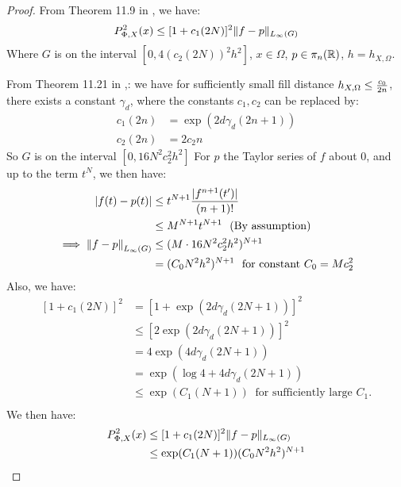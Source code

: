 \documentclass[twoside]{memoir}
\begin{document}
\begin{proof}
	From Theorem 11.9 in \cite{ScatteredDataApproximation}, we have:
	\[ P_{\Phi, X}^2(x) \leq [1 + c_1(2N)]^2 \lVert f - p\rVert_{L_\infty(G)} \]
	Where $G$ is on the interval $[0, 4(c_2(2N))^2h^2]$, $x \in \Omega$, $p \in \pi_n(\mathbb{R})$, $h = h_{X, \Omega}$.
	
	From Theorem 11.21 in \cite{ScatteredDataApproximation},: we have for sufficiently small fill distance $h_{X,\Omega} \leq \frac{c_0}{2n}$, there exists a constant $\gamma_d$, where the constants $c_1, c_2$ can be replaced by:
	\begin{equation*}
	\begin{split}
	c_1(2n) &= \exp(2d\gamma_d(2n+1))\\
	c_2(2n) &= 2c_2n
	\end{split}
	\end{equation*}
	So $G$ is on the interval $[0, 16N^2c_2^2h^2]$
	For $p$ the Taylor series of $f$ about 0, and up to the term $t^N$, we then have:
	\begin{equation*}
	\begin{split}
	|f(t) - p(t)| &\leq t^{N+1}\frac{|f^{n+1}(t')|}{(n+1)!} \\
	&\leq M^{N+1}t^{N+1} ~ \text{ (By assumption)} \\
	\implies {\lVert f - p\rVert}_{L_\infty(G)} &\leq (M \cdot 16N^2c_2^2h^2)^{N+1} \\
	&= (C_0 N^2 h^2)^{N+1} ~ \text{ for constant }C_0 = Mc_2^2 \\
	\end{split}
	\end{equation*}
	Also, we have:
	\begin{equation*}
	\begin{split}
	[1 + c_1(2N)]^2 &= [1 + \exp(2d\gamma_d(2N + 1))]^2 \\
	&\leq [2\exp(2d\gamma_d(2N + 1))]^2 \\
	&= 4\exp(4d\gamma_d(2N + 1)) \\
	&= \exp(\log 4 + 4d\gamma_d(2N + 1)) \\
	&\leq \exp(C_1(N+1)) ~ \text{ for sufficiently large }C_1.\\
	\end{split}
	\end{equation*}
	We then have:
	\begin{equation} \label{eqn:P2bound}
	\begin{split}
	P^2_{\Phi, X}(x) &\leq [1 + c_1(2N)]^2 \norm{f - p}_{L_\infty(G)} \\
	&\leq \exp(C_1(N+1))( C_0 N^2 h^2)^{N+1} \\

\end{split}
\end{equation}
\end{proof}
\end{document}
